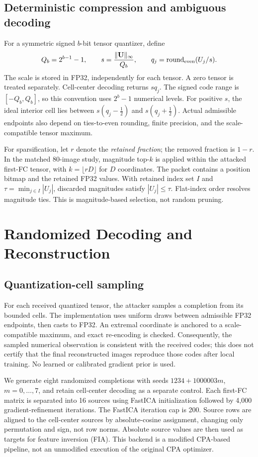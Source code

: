 \documentclass{article}
\newcommand{\U}{\mathbf{U}}
\begin{document}
\subsection{Deterministic compression and ambiguous decoding}
For a symmetric signed $b$-bit tensor quantizer, define
\begin{equation}
 Q_b=2^{b-1}-1,\qquad
 s=\frac{\|\U\|_\infty}{Q_b},\qquad
 q_j=\operatorname{round}_{\rm even}(U_j/s).
 \label{eq:quant}
\end{equation}
The scale is stored in FP32, independently for each tensor. A zero tensor
is treated separately. Cell-center decoding returns $s q_j$. The signed
code range is $[-Q_b,Q_b]$, so this convention uses $2^b-1$ numerical levels.
For positive $s$, the ideal interior cell lies between
$s(q_j-\tfrac12)$ and $s(q_j+\tfrac12)$. Actual admissible endpoints also
depend on ties-to-even rounding, finite precision, and the scale-compatible
tensor maximum.

For sparsification, let $r$ denote the \emph{retained fraction}; the removed
fraction is $1-r$. In the matched 80-image study, magnitude top-$k$ is
applied within the attacked first-FC tensor, with
$k=\lfloor rD\rfloor$ for $D$ coordinates. The packet contains a position
bitmap and the retained FP32 values. With retained index set $I$ and
$\tau=\min_{j\in I}|U_j|$, discarded magnitudes satisfy
$|U_j|\leq\tau$. Flat-index order resolves magnitude ties. This is
magnitude-based selection, not random pruning.

\section{Randomized Decoding and Reconstruction}
\label{sec:method}
\subsection{Quantization-cell sampling}
For each received quantized tensor, the attacker samples a completion from
its bounded cells. The implementation uses uniform draws between admissible
FP32 endpoints, then casts to FP32. An extremal coordinate is anchored to
a scale-compatible maximum, and exact re-encoding is checked. Consequently,
the sampled numerical observation is consistent with the received codes;
this does not certify that the final reconstructed images reproduce those
codes after local training. No learned or calibrated gradient prior is used.

We generate eight randomized completions with seeds
$1234+1000003m$, $m=0,\ldots,7$, and retain cell-center decoding as a
separate control. Each first-FC matrix is separated into 16 sources using
FastICA initialization followed by 4,000 gradient-refinement iterations.
The FastICA iteration cap is 200. Source rows are aligned to the
cell-center sources by absolute-cosine assignment, changing only permutation
and sign, not row norms. Absolute source values are then used as targets
for feature inversion (FIA). This backend is a modified CPA-based pipeline,
not an unmodified execution of the original CPA optimizer.
\end{document}
